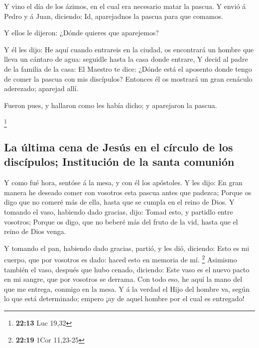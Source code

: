  Y vino el día de los ázimos, en el cual era necesario matar
la pascua.  Y envió á Pedro y á Juan, diciendo: Id,
aparejadnos la pascua para que comamos.

 Y ellos le dijeron: ¿Dónde quieres que aparejemos?

 Y él les dijo: He aquí cuando entrareis en la ciudad, os
encontrará un hombre que lleva un cántaro de agua: seguidle hasta la
casa donde entrare,  Y decid al padre de la familia de la
casa: El Maestro te dice: ¿Dónde está el aposento donde tengo de comer
la pascua con mis discípulos?  Entonces él os mostrará un
gran cenáculo aderezado; aparejad allí.

 Fueron pues, y hallaron como les había dicho; y aparejaron
la pascua.

\footnote{\textbf{22:13} Luc 19,32}

\hypertarget{la-uxfaltima-cena-de-jesuxfas-en-el-cuxedrculo-de-los-discuxedpulos-instituciuxf3n-de-la-santa-comuniuxf3n}{%
\subsection{La última cena de Jesús en el círculo de los discípulos;
Institución de la santa
comunión}\label{la-uxfaltima-cena-de-jesuxfas-en-el-cuxedrculo-de-los-discuxedpulos-instituciuxf3n-de-la-santa-comuniuxf3n}}

 Y como fué hora, sentóse á la mesa, y con él los
apóstoles.  Y les dijo: En gran manera he deseado comer con
vosotros esta pascua antes que padezca;  Porque os digo que
no comeré más de ella, hasta que se cumpla en el reino de Dios.
 Y tomando el vaso, habiendo dado gracias, dijo: Tomad
esto, y partidlo entre vosotros;  Porque os digo, que no
beberé más del fruto de la vid, hasta que el reino de Dios venga.

 Y tomando el pan, habiendo dado gracias, partió, y les
dió, diciendo: Esto es mi cuerpo, que por vosotros es dado: haced esto
en memoria de mí. \footnote{\textbf{22:19} 1Cor 11,23-25} 
Asimismo también el vaso, después que hubo cenado, diciendo: Este vaso
es el nuevo pacto en mi sangre, que por vosotros se derrama.
 Con todo eso, he aquí la mano del que me entrega, conmigo
en la mesa.  Y á la verdad el Hijo del hombre va, según lo
que está determinado; empero ¡ay de aquel hombre por el cual es
entregado!

